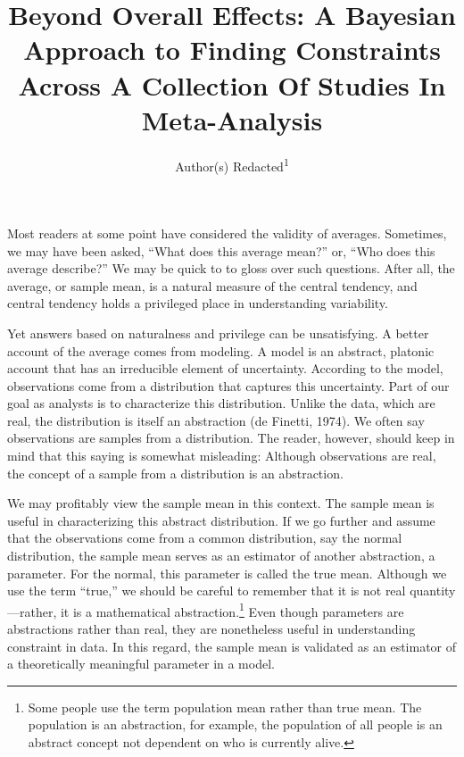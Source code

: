 \documentclass[english,man]{apa6}
\title{Beyond Overall Effects: A Bayesian Approach to Finding Constraints
Across A Collection Of Studies In Meta-Analysis}
\author{Author(s) Redacted\textsuperscript{1}}
\affiliation{
    \vspace{0.5cm}
          \textsuperscript{1} Institution(s) Redacted  }
\theoremstyle{definition}
\theoremstyle{definition}
\theoremstyle{remark}
\begin{document}
\maketitle

\setcounter{secnumdepth}{0}



Most readers at some point have considered the validity of averages.
Sometimes, we may have been asked, \enquote{What does this average
mean?} or, \enquote{Who does this average describe?} We may be quick to
to gloss over such questions. After all, the average, or sample mean, is
a natural measure of the central tendency, and central tendency holds a
privileged place in understanding variability.

Yet answers based on naturalness and privilege can be unsatisfying. A
better account of the average comes from modeling. A model is an
abstract, platonic account that has an irreducible element of
uncertainty. According to the model, observations come from a
distribution that captures this uncertainty. Part of our goal as
analysts is to characterize this distribution. Unlike the data, which
are real, the distribution is itself an abstraction (de Finetti, 1974).
We often say observations are samples from a distribution. The reader,
however, should keep in mind that this saying is somewhat misleading:
Although observations are real, the concept of a sample from a
distribution is an abstraction.

We may profitably view the sample mean in this context. The sample mean
is useful in characterizing this abstract distribution. If we go further
and assume that the observations come from a common distribution, say
the normal distribution, the sample mean serves as an estimator of
another abstraction, a parameter. For the normal, this parameter is
called the true mean. Although we use the term \enquote{true,} we should
be careful to remember that it is not real quantity---rather, it is a
mathematical abstraction.\footnote{Some people use the term population
  mean rather than true mean. The population is an abstraction, for
  example, the population of all people is an abstract concept not
  dependent on who is currently alive.} Even though parameters are
abstractions rather than real, they are nonetheless useful in
understanding constraint in data. In this regard, the sample mean is
validated as an estimator of a theoretically meaningful parameter in a
model.
\end{document}
